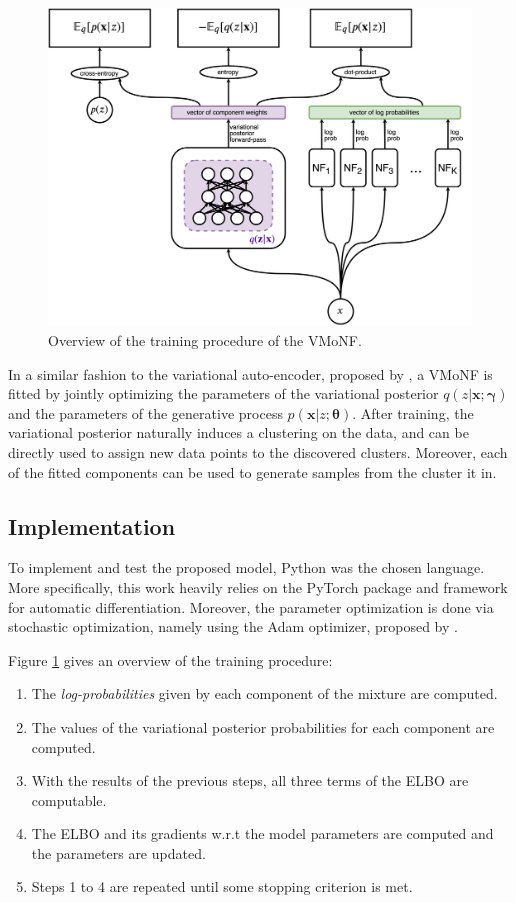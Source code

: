 \begin{figure}[!htb]
  \centering
  \includegraphics[width=0.85\linewidth]{figures/train_overview.png}
  \caption{Overview of the training procedure of the VMoNF.}
  \label{fig:modeloverview}
\end{figure}

In a similar fashion to the variational auto-encoder, proposed by \textcite{vaepaper},
a VMoNF is fitted by jointly optimizing the parameters of the variational
posterior $q(z|\bm{x}; \bm\gamma)$ and the parameters of the generative process
$p(\bm{x}|z; \bm\theta)$.
After training, the variational posterior naturally induces a clustering on
the data, and can be directly used to assign new data points to the discovered clusters.
Moreover, each of the fitted components can be used to generate samples from the
cluster it  in.

\subsection{Implementation}

To implement and test the proposed model, Python was the chosen language. More
specifically, this work heavily relies on the PyTorch \autocite{pytorch} package
and framework for automatic differentiation. Moreover, the parameter optimization
is done via stochastic optimization, namely using the Adam optimizer, proposed by
\textcite{adam}.

Figure \ref{fig:modeloverview} gives an overview of the training procedure:
\begin{enumerate}
    \item The \emph{log-probabilities} given by each component of the mixture
    are computed.
    \item The values of the variational posterior probabilities for each
    component are computed.
    \item With the results of the previous steps, all three terms of the ELBO
    are computable.
    \item The ELBO and its gradients w.r.t the model parameters are computed
    and the parameters are updated.
    \item Steps 1 to 4 are repeated until some stopping criterion is met.
\end{enumerate}

